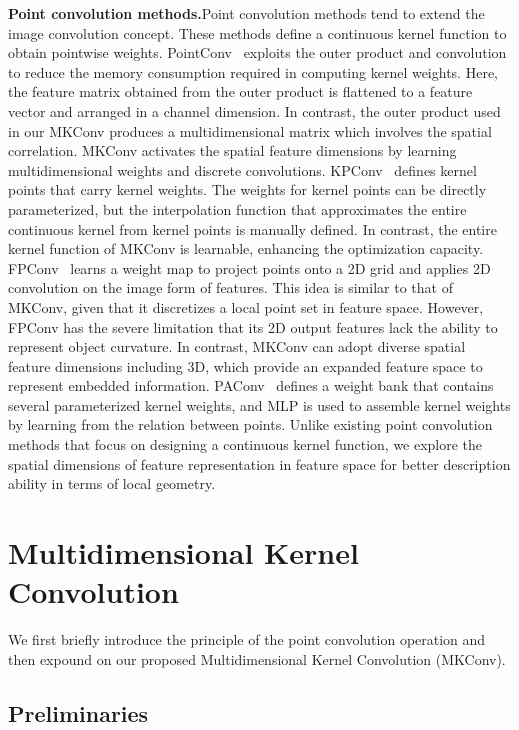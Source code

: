 \documentclass[preprint,12pt]{elsarticle}
\begin{document}
\medskip	
\noindent\textbf{Point convolution methods.}\hspace{0.3cm}Point convolution methods tend to extend the image convolution concept. These methods define a continuous kernel function to obtain pointwise weights.
PointConv~\citep{wu2019pointconv} exploits the outer product and  convolution to reduce the memory consumption required in computing kernel weights. Here, the feature matrix obtained from the outer product is flattened to a feature vector and arranged in a channel dimension. In contrast, the outer product used in our MKConv produces a multidimensional matrix which involves the spatial correlation. MKConv activates the spatial feature dimensions by learning multidimensional weights and discrete convolutions. KPConv~\citep{thomas2019kpconv} defines kernel points that carry kernel weights. The weights for kernel points can be directly parameterized, but the interpolation function that approximates the entire continuous kernel from kernel points is manually defined. In contrast, the entire kernel function of MKConv is learnable, enhancing the optimization capacity. FPConv~\citep{lin2020fpconv} learns a weight map to project points onto a 2D grid and applies 2D convolution on the image form of features. This idea is similar to that of MKConv, given that it discretizes a local point set in feature space. However, FPConv has the severe limitation that its 2D output features lack the ability to represent object curvature. In contrast, MKConv can adopt diverse spatial feature dimensions including 3D, which provide an expanded feature space to represent embedded information. PAConv~\citep{xu2021paconv} defines a weight bank that contains several parameterized kernel weights, and MLP is used to assemble kernel weights by learning from the relation between points. Unlike existing point convolution methods that focus on designing a continuous kernel function, we explore the spatial dimensions of feature representation in feature space for better description ability in terms of local geometry.

\section{Multidimensional Kernel Convolution}
We first briefly introduce the principle of the point convolution operation and then expound on our proposed Multidimensional Kernel Convolution (MKConv). 

\subsection{Preliminaries}
\end{document}
